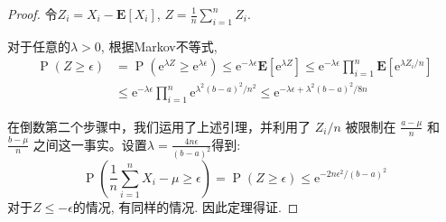 \begin{proof}
    令$Z_i=X_i-\mathbf{E}\left[X_i\right]$, $Z=\frac 1 n \sum_{i=1}^n Z_i.$

    对于任意的$\lambda>0$, 根据Markov不等式, 
    $$
    \begin{aligned}
    \operatorname{P}(Z \geq \epsilon) & =\operatorname{P}\left(\mathrm{e}^{\lambda Z} \geq \mathrm{e}^{\lambda \epsilon}\right) \leq \mathrm{e}^{-\lambda \epsilon} \mathbf{E}\left[\mathrm{e}^{\lambda Z}\right] \leq \mathrm{e}^{-\lambda \epsilon} \prod_{i=1}^n \mathbf{E}\left[\mathrm{e}^{\lambda Z_i / n}\right] \\
    & \leq \mathrm{e}^{-\lambda \epsilon} \prod_{i=1}^n \mathrm{e}^{\lambda^2(b-a)^2 / n^2} \leq \mathrm{e}^{-\lambda \epsilon+\lambda^2(b-a)^2 / 8 n}
    \end{aligned}
    $$

    在倒数第二个步骤中，我们运用了上述引理，并利用了 $Z_i/n$ 被限制在 $\frac{a - \mu}{n}$ 和 $\frac{b - \mu}{n}$ 之间这一事实。设置$\lambda=\frac{4 n \epsilon}{(b-a)^2}$得到: 
    $$
\operatorname{P}\left(\frac{1}{n} \sum_{i=1}^n X_i-\mu \geq \epsilon\right)=\operatorname{P}(Z \geq \epsilon) \leq \mathrm{e}^{-2 n \epsilon^2 /(b-a)^2}
$$
对于$Z\leq -\epsilon$的情况, 有同样的情况. 因此定理得证. 

\end{proof}